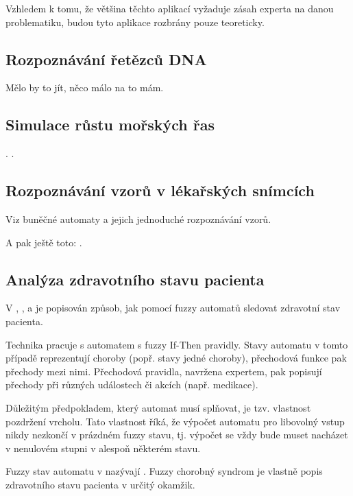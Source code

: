 \documentclass[a4paper,10pt]{article}
\begin{document}
Vzhledem k tomu, že většina těchto aplikací vyžaduje zásah experta na danou problematiku, budou tyto aplikace rozbrány pouze teoreticky.


\subsection{Rozpoznávání řetězců DNA}


Mělo by to jít, něco málo na to mám. \cite{SnaKepAbrHas-AproxStriMatchFuzzAut}



\subsection{Simulace růstu mořských řas}

\cite{CheMyn-ModAlgBloDutCosWat+}. .

\subsection{Rozpoznávání vzorů v lékařských snímcích}
Viz buněčné automaty a jejich jednoduché rozpoznávání vzorů.

A pak ještě toto: \cite{PatPal-FuzGraSynRecSkeMatXra}.

\subsection{Analýza zdravotního stavu pacienta}
V \cite{Jia+-ExHeaSimMetBasIntHumTheMod}, \cite{GupRah-CliMonUsFuzSys}, \cite{CamMerNun-UsFuzAutDiagPrHeaPro} a \cite{SteAdl-CliMonFuzAut} je popisován způsob, jak pomocí fuzzy automatů sledovat zdravotní stav pacienta. 


Technika pracuje s automatem s fuzzy If-Then pravidly. Stavy automatu v tomto případě reprezentují choroby (popř. stavy jedné choroby), přechodová funkce pak přechody mezi nimi. Přechodová pravidla, navržena expertem, pak popisují přechody při různých událostech či akcích (např. medikace). 

Důležitým předpokladem, který automat musí splňovat, je tzv. vlastnost pozdržení vrcholu. Tato vlastnost říká, že výpočet automatu pro libovolný vstup nikdy nezkončí v prázdném fuzzy stavu, tj. výpočet se vždy bude muset nacházet v nenulovém stupni v alespoň některém stavu.


Fuzzy stav automatu v \cite{GupRah-CliMonUsFuzSys} nazývají . Fuzzy chorobný syndrom je vlastně popis zdravotního stavu pacienta v určitý okamžik. 
\end{document}
